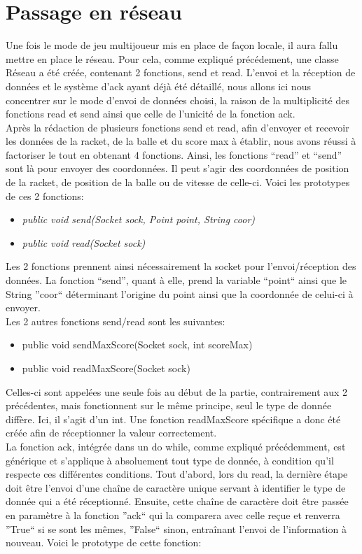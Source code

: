 \section{Passage en réseau}
Une fois le mode de jeu multijoueur mis en place de façon locale, il aura fallu mettre en place le réseau. 
Pour cela, comme expliqué précédement, une classe Réseau a été créée, contenant 2 fonctions, send et read. 
L'envoi et la réception de données et le système d'ack ayant déjà été détaillé, nous allons ici nous concentrer sur le 
mode d'envoi de données choisi, la raison de la multiplicité des fonctions read et send ainsi que celle de l'unicité 
de la fonction ack.
\\
Après la rédaction de plusieurs fonctions send et read, afin d'envoyer et recevoir les données de la racket, de la balle 
et du score max à établir, nous avons réussi à factoriser le tout en obtenant 4 fonctions. Ainsi, les fonctions ``read'' et 
``send'' sont là pour envoyer des coordonnées. Il peut s'agir des coordonnées de position de la racket, de position de la balle 
ou de vitesse de celle-ci. Voici les prototypes de ces 2 fonctions:
\begin{itemize}
 \item \textit{public void send(Socket sock, Point point, String coor)}
 \item \textit{public void read(Socket sock)}
\end{itemize}

Les 2 fonctions prennent ainsi nécessairement la socket pour l'envoi/réception des données. La fonction ``send'', quant à 
elle, prend la variable ``point`` ainsi que le String ''coor`` déterminant l'origine du point ainsi que la 
coordonnée de celui-ci à envoyer.
\\
Les 2 autres fonctions send/read sont les suivantes:
\begin{itemize}
 \item public void sendMaxScore(Socket sock, int scoreMax)
 \item public void readMaxScore(Socket sock)
\end{itemize}

Celles-ci sont appelées une seule fois au début de la partie, contrairement aux 2 précédentes, mais fonctionnent sur le même 
principe, seul le type de donnée diffère. Ici, il s'agit d'un int. Une fonction readMaxScore spécifique a donc été créée afin 
de réceptionner la valeur correctement.
\\
La fonction ack, intégrée dans un do while, comme expliqué précédemment, est générique et s'applique à absoluement tout type 
de donnée, à condition qu'il respecte ces différentes conditions. Tout d'abord, lors du read, la dernière étape 
doit être l'envoi d'une chaîne de caractère unique servant à identifier le type de donnée qui a été réceptionné. Ensuite, 
cette chaîne de caractère doit être passée en paramètre à la fonction ''ack`` qui la comparera avec celle reçue et renverra 
''True`` si se sont les mêmes, ''False`` sinon, entraînant l'envoi de l'information à nouveau. Voici le prototype de 
cette fonction:

